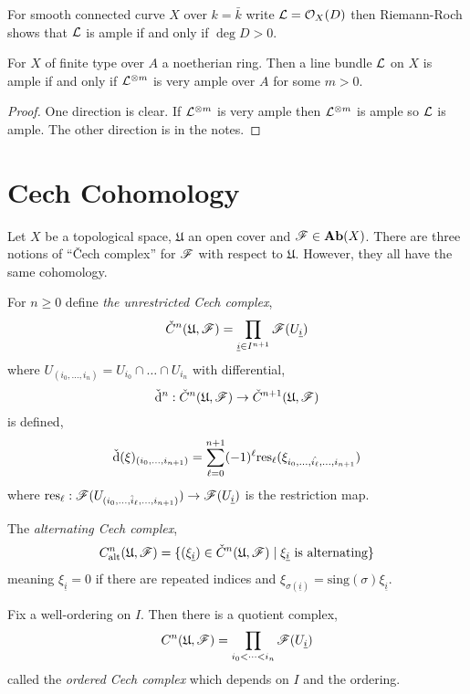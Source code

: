 \documentclass[12pt]{article}
\begin{document}
\begin{rmk}
For smooth connected curve $X$ over $k = \bar{k}$ write $\mathcal{L} = \mathcal{O}_{X}(D)$ then Riemann-Roch shows that $\mathcal{L}$ is ample if and only if $\deg{D} > 0$. 
\end{rmk}

\begin{thm}
For $X$ of finite type over $A$ a noetherian ring. Then a line bundle $\mathcal{L}$ on $X$ is ample if and only if $\mathcal{L}^{\otimes m}$ is very ample over $A$ for some $m > 0$.
\end{thm}

\begin{proof}
One direction is clear. If $\mathcal{L}^{\otimes m}$ is very ample then $\mathcal{L}^{\otimes m}$ is ample so $\mathcal{L}$ is ample. The other direction is in the notes.
\end{proof}

\section{Cech Cohomology}

\renewcommand{\U}{\mathfrak{U}}

Let $X$ be a topological space, $\U$ an open cover and $\mathscr{F} \in \mathbf{Ab}(X)$. There are three notions of ``\v{C}ech complex'' for $\mathscr{F}$ with respect to $\U$. However, they all have the same cohomology.

\begin{defn}
For $n \ge 0$ define \textit{the unrestricted Cech complex},
\[ \check{C}^n(\U, \F) = \prod_{\underline{i} \in I^{n+1}} \F(U_{\underline{i}}) \]
where $U_{(i_0, \dots, i_n)} = U_{i_0} \cap \dots \cap U_{i_n}$ with differential,
\[ \check{\d}^n : \check{C}^n(\U, \F) \to \check{C}^{n+1}(\U, \F) \]
is defined,
\[ \check{\mathrm{d}}(\xi)_{(i_0, \dots, i_{n+1})} = \sum_{\ell = 0}^{n+1} (-1)^\ell \mathrm{res}_\ell (\xi_{i_0, \dots, \hat{i_\ell}, \dots, i_{n+1}}) \]
where $\mathrm{res}_\ell : \mathscr{F}(U_{(i_0, \dots, \hat{i}_\ell, \dots, i_{n+1})}) \to \mathscr{F}(U_{\underline{i}})$ is the restriction map. 
\end{defn}

\begin{defn}
The \textit{alternating Cech complex},
\[ C^n_{\text{alt}}(\U, \F) = \{ (\xi_{\underline{i}}) \in \check{C}^n(\U, \F) \mid \xi_{\underline{i}} \text{ is alternating} \} \]
meaning $\xi_{\underline{i}} = 0$ if there are repeated indices and $\xi_{\sigma(\underline{i})} = \mathrm{sing}(\sigma) \xi_{\underline{i}}$. 
\end{defn}

\begin{defn}
Fix a well-ordering on $I$. Then there is a quotient complex,
\[ C^n(\U, \F) = \prod_{i_0 < \dots < i_n} \F(U_{\underline{i}}) \]
called the \textit{ordered Cech complex} which depends on $I$ and the ordering.
\end{defn}
\end{document}
